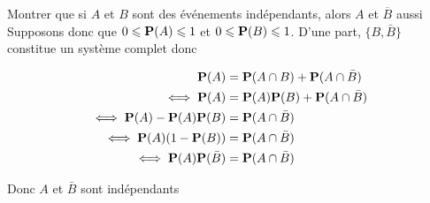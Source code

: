 \documentclass{article}
\renewenvironment{question_kholle}[2][ ]
{
	\subsection{\texorpdfstring{#2}{}}
	\notblank{#1}
	{
		\noindent #1
		\bigbreak
	}
	{}
	\begin{proof}
}
{
	\end{proof}
}
\begin{document}
\begin{question_kholle}{Montrer que si $A$ et $B$ sont des événements indépendants, alors $A$ et $\overline{B}$ aussi}
	Supposons donc que $0 \leqslant \mathbf P(A) \leqslant 1$ et $0 \leqslant \mathbf P(B) \leqslant 1$.
	D'une part, $\{ B, \bar{B} \}$ constitue un système complet donc
	
	\begin{align*}
		\mathbf P(A) &= \mathbf P(A \cap B) + \mathbf P(A \cap \bar{B}) \\
		\iff \mathbf P(A)&= \mathbf P(A) \mathbf P(B) + \mathbf P(A \cap \bar{B}) \\
		\iff \mathbf P(A) - \mathbf P(A) \mathbf P(B) &= \mathbf P(A \cap \bar{B}) \\
		\iff \mathbf P(A)(1-\mathbf P(B))&= \mathbf P(A \cap \bar{B}) \\
		\iff \mathbf P(A) \mathbf P(\bar{B})&= \mathbf P(A \cap \bar{B})
	\end{align*}
	
	Donc $A$ et $\bar B$ sont indépendants
\end{question_kholle}
\end{document}
